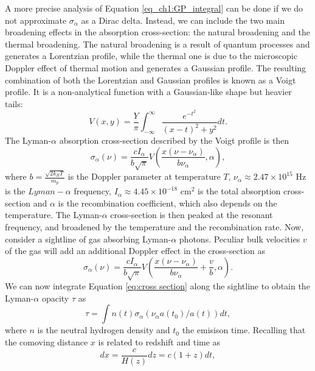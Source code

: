 A more precise analysis of Equation \ref{eq_ch1:GP_integral} can be done if we do not approximate $\sigma_\alpha$ as a Dirac delta. Instead, we can include the two main broadening effects in the absorption cross-section: the natural broadening and the thermal broadening. The natural broadening is a result of quantum processes and generates a Lorentzian profile, while the thermal one is due to the microscopic Doppler effect of thermal motion and generates a Gaussian profile. The resulting combination of both the Lorentzian and Gaussian profiles is known as a Voigt profile. It is a non-analytical function with a Gaussian-like shape but heavier tails:
\begin{equation}\label{eq: Voigt}
    V(x,y)=\frac{Y}{\pi}\int_{-\infty}^{\infty}\frac{e^{-t^2}}{(x-t)^2+y^2} dt.
\end{equation}
The Lyman-$\alpha$ absorption cross-section described by the Voigt profile is then
\begin{equation}
    \sigma_\alpha(\nu)=\frac{cI_\alpha}{b\sqrt{\pi}} V\left(\frac{x(\nu-\nu_\alpha)}{b\nu_\alpha}, \alpha  \right),
\end{equation}
where $b=\frac{\sqrt{2k_BT}}{m_p}$ is the Doppler parameter at temperature $T$, $\nu_\alpha \approx 2.47\times 10^{15}$ Hz is the $Lyman-\alpha$ frequency, $I_\alpha \approx 4.45\times 10^{-18}$ cm$^{2}$ is the total absorption cross-section \cite{Mo2010} and $\alpha$ is the recombination coefficient, which also depends on the temperature.
The Lyman-$\alpha$ cross-section is then peaked at the resonant frequency, and broadened by the temperature and the recombination rate. Now, consider a sightline of gas absorbing Lyman-$\alpha$ photons. Peculiar bulk velocities $v$ of the gas will add an additional Doppler effect in the cross-section as
\begin{equation}\label{eq:cross section}
    \sigma_\alpha(\nu)=\frac{cI_\alpha}{b\sqrt{\pi}} V\left(\frac{x(\nu-\nu_\alpha)}{b\nu_\alpha} +\frac{v}{b}, \alpha  \right).
\end{equation}
We can now integrate Equation \ref{eq:cross section} along the sightline to obtain the Lyman-$\alpha$ opacity $\tau$ as
\begin{equation}
    \tau = \int n(t)\sigma_\alpha(\nu_\alpha a(t_0)/a(t)) dt,
\end{equation}
where $n$ is the neutral hydrogen density and $t_0$ the emisison time.
Recalling that the comoving distance $x$ is related to redshift and time as 
\begin{equation}
    dx=\frac{c}{H(z)}dz=c(1+z)dt,
\end{equation}
